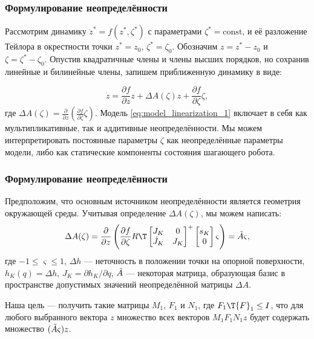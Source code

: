 \begin{frame}
	\frametitle{Формулирование неопределённости}
	Рассмотрим динамику $\dot z^* = f(z^*, \zeta^*)$ с параметрами $\zeta^* = \text{const}$, и её разложение Тейлора в окрестности точки $z^* = z_0$, $\zeta^* = \zeta_0$. Обозначим $z = z^* - z_0$ и $\zeta = \zeta^* - \zeta_0$.
	Опустив квадратичные члены и члены высших порядков, но сохранив линейные и билинейные члены, запишем приближенную динамику в виде:
	
	\begin{equation}
		\label{eq:model_linearization_1}
		\dot z = \frac{\partial f}{\partial z} z + \Delta {A}(\zeta) z + \frac{\partial f}{\partial \zeta} \zeta,
	\end{equation}
	где $\Delta {A}(\zeta) = \frac{\partial}{\partial z} (\frac{\partial f}{\partial \zeta} \zeta)$.
	\vfill
	Модель \eqref{eq:model_linearization_1} включает в себя как мультипликативные, так и аддитивные неопределённости. Мы можем интерпретировать постоянные параметры $\zeta$ как неопределённые параметры модели, либо как статические компоненты состояния шагающего робота. 
\end{frame}

\begin{frame}
	\frametitle{Формулирование неопределённости}
	Предположим, что основным источником неопределённости является геометрия окружающей среды. Учитывая определение $\Delta {A}(\zeta)$, мы можем написать:
	\begin{equation}
		\Delta {A}(\zeta) = 
		\frac{\partial}{\partial z} 
		\left (
		\frac{\partial f}{\partial \zeta} {R}\T 
		\begin{bmatrix}
			{J}_K & 0 \\ \dot{{J}}_K & {J}_K
		\end{bmatrix}^+ 
		\begin{bmatrix}
			s_K \\ 0
		\end{bmatrix} \varsigma 
		\right )
		= \Tilde{A} \varsigma,
	\end{equation}
	где  $-1 \leq \varsigma \leq 1$, $\Delta h$ --- неточность в положении точки на опорной поверхности, $h_K(q) = \Delta h$, ${J}_K = \partial h_K / \partial q$, $\Tilde{A}$ --- некоторая матрица, образующая базис в пространстве допустимых значений неопределённой матрицы $\Delta {A}$.
	
	Наша цель --- получить такие матрицы ${M}_1$, ${F}_1$ и ${N}_1$, где ${F}_1\T {F}_1 \leq {I}$, что для любого выбранного вектора $z$ множество всех векторов ${M}_1 {F}_1 {N}_1 z$ будет содержать множество $(\Tilde{A} \varsigma) z$. 
\end{frame}

